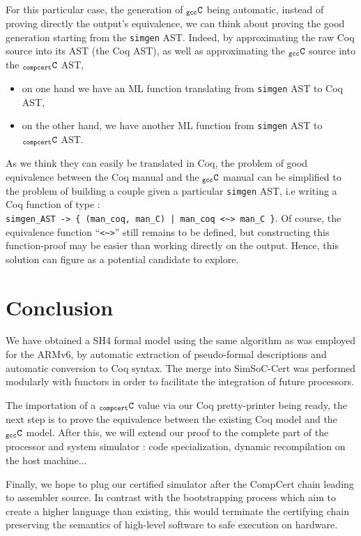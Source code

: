 \documentclass[a4paper, 11pt]{article}
\newcommand{\simgen}{{\tt simgen}\xspace}
\newcommand{\C}{$_{\tt compcert}{\tt C}$\xspace}
\newcommand{\gccC}{$_{\tt gcc}{\tt C}$\xspace}
\newcommand{\SScert}{SimSoC-Cert\xspace}
\begin{document}
For this particular case, the generation of \gccC being automatic, instead of proving directly the output's equivalence, we can think about proving the good generation starting from the \simgen AST. Indeed, by approximating the raw Coq source into its AST (the Coq AST), as well as approximating the \gccC source into the \C AST, 
\begin{itemize}
\item on one hand we have an ML function translating from \simgen AST to Coq AST,
\item on the other hand, we have another ML function from \simgen AST to \C AST.
\end{itemize} 
As we think they can easily be translated in Coq, the problem of good equivalence between the Coq manual and the \gccC manual can be simplified to the problem of building a couple given a particular \simgen AST, i.e writing a Coq function of type : \\
\verb!simgen_AST -> { (man_coq, man_C) | man_coq <~> man_C }!. Of course, the equivalence function ``\verb|<~>|'' still remains to be defined, but constructing this function-proof may be easier than working directly on the output. Hence, this solution can figure as a potential candidate to explore.

\section{Conclusion}
\label{s:concl}

We have obtained a SH4 formal model using the same algorithm as was employed for the ARMv6, by automatic extraction of pseudo-formal descriptions and automatic conversion to Coq syntax. The merge into \SScert was performed modularly with functors in order to facilitate the integration of future processors.

The importation of a \C value via our Coq pretty-printer being ready, the next step is to prove the equivalence between the existing Coq model and the \gccC model. After this, we will extend our proof to the complete part of the processor and system simulator : code specialization, dynamic recompilation on the host machine...

Finally, we hope to plug our certified simulator after the CompCert chain leading to assembler source. In contrast with the bootstrapping process which aim to create a higher language than existing, this would terminate the certifying chain preserving the semantics of high-level software to safe execution on hardware.
\end{document}
